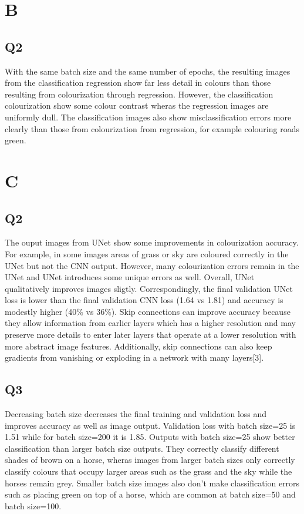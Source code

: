 \documentclass[12pt,letterpaper]{article} %
\begin{document}

\section{B}

\subsection{Q2}

With the same batch size and the same number of epochs, the resulting images from the classification regression show far less detail in colours than those resulting from colourization through regression. However, the classification colourization show some colour contrast wheras the regression images are uniformly dull. The classification images also show misclassification errors more clearly than those from colourization from regression, for example colouring roads green.

\section{C}

\subsection{Q2}

The ouput images from UNet show some improvements in colourization accuracy. For example, in some images areas of grass or sky are coloured correctly in the UNet but not the CNN output. However, many colourization errors remain in the UNet and UNet introduces some unique errors as well. Overall, UNet qualitatively improves images sligtly. Correspondingly, the final validation UNet loss is lower than the final validation CNN loss (1.64 vs 1.81) and accuracy is modestly higher (40\% vs 36\%). Skip connections can improve accuracy because they allow information from earlier layers which has a higher resolution and may preserve more details to enter later layers that operate at a lower resolution with more abstract image features. Additionally, skip connections can also keep gradients from vanishing or exploding in a network with many layers[3].

\subsection{Q3}
Decreasing batch size decreases the final training and validation loss and improves accuracy as well as image output. Validation loss with batch size=25 is 1.51 while for batch size=200 it is 1.85. Outputs with batch size=25 show better classification than larger batch size outputs. They correctly classify different shades of brown on a horse, wheras images from larger batch sizes only correctly classify colours that occupy larger areas such as the grass and the sky while the horses remain grey. Smaller batch size images also don't make classification errors such as placing green on top of a horse, which are common at batch size=50 and batch size=100.
\end{document}
